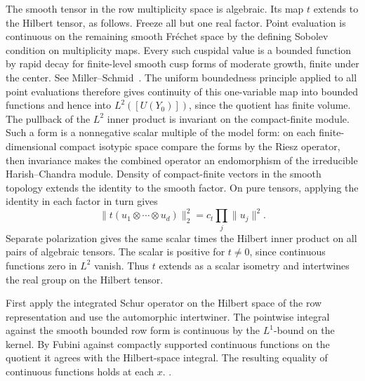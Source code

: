 The smooth tensor in the row multiplicity space is algebraic.
Its map \(t\) extends to the Hilbert tensor, as follows. Freeze
all but one real factor. Point evaluation is continuous on the
remaining smooth Fr\'echet space by the defining Sobolev
condition on multiplicity maps. Every such cuspidal value is a
bounded function by rapid decay for finite-level smooth cusp
forms of moderate growth, finite under the center.
See Miller--Schmid~\cite[Theorems~A and~2.23--2.24]{p2miller-schmid-decay}.
The uniform boundedness
principle applied to all point evaluations therefore gives
continuity of this one-variable map into bounded functions and
hence into \(L^2([U(Y_0)])\), since the quotient has finite volume.
The pullback of the \(L^2\) inner product is invariant on the
compact-finite module. Such a form is a nonnegative scalar
multiple of the model form: on each finite-dimensional compact
isotypic space compare the forms by the Riesz operator, then
invariance makes the combined operator an endomorphism of the
irreducible Harish--Chandra module. Density of compact-finite
vectors in the smooth topology extends the identity to the
smooth factor. On pure tensors, applying the identity in each
factor in turn gives
\[
 \|t(u_1\otimes\cdots\otimes u_d)\|_2^2
     =c_t\prod_j\|u_j\|^2 .
\]
Separate polarization gives the same scalar times the Hilbert
inner product on all pairs of algebraic tensors. The scalar is
positive for \(t\ne0\), since continuous functions zero in
\(L^2\) vanish. Thus \(t\) extends as a scalar isometry and
intertwines the real group on the Hilbert tensor.

First apply the integrated Schur
operator on the Hilbert space of the row representation and
use the automorphic intertwiner. The pointwise integral against
the smooth bounded row form is continuous by the \(L^1\)-bound
on the kernel. By Fubini against compactly supported continuous
functions on the quotient it agrees with the Hilbert-space
integral. The resulting equality of continuous functions holds
at each \(x\).
.

